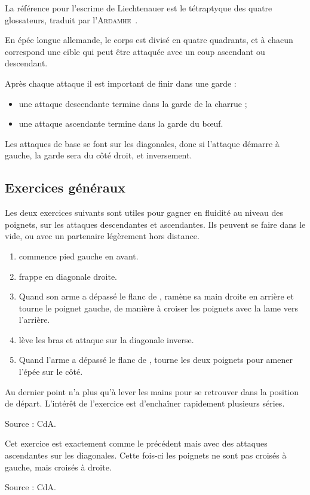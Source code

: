 La référence pour l'escrime de Liechtenauer est le tétraptyque des quatre glossateurs, traduit par l'\textsc{Ardamhe}~\cite{ardamhe:tetraptyque}.

En épée longue allemande, le corps est divisé en quatre quadrants, et à chacun correspond une cible qui peut être attaquée avec un coup ascendant ou descendant.

Après chaque attaque il est important de finir dans une garde :
\begin{itemize}
	\item une attaque descendante termine dans la garde de la charrue ;
	\item une attaque ascendante termine dans la garde du bœuf.
\end{itemize}
Les attaques de base se font sur les diagonales, donc si l'attaque démarre à gauche, la garde sera du côté droit, et inversement.

\subsection{Exercices généraux}

Les deux exercices suivants sont utiles pour gagner en fluidité au niveau des poignets, sur les attaques descendantes et ascendantes. Ils peuvent se faire dans le vide, ou avec un partenaire légèrement hors distance.

\begin{exercice}
\begin{enumerate}
	\item \A commence pied gauche en avant.
	\item \A frappe en diagonale droite.
	\item Quand son arme a dépassé le flanc de \D, \A ramène sa main droite en arrière et tourne le poignet gauche, de manière à croiser les poignets avec la lame vers l'arrière.
	\item \A lève les bras et attaque sur la diagonale inverse.
	\item Quand l'arme a dépassé le flanc de \D, \A tourne les deux poignets pour amener l'épée sur le côté.
\end{enumerate}

Au dernier point \A n'a plus qu'à lever les mains pour se retrouver dans la position de départ. L'intérêt de l'exercice est d'enchaîner rapidement plusieurs séries.

Source : CdA.
\end{exercice}

\begin{exercice}
Cet exercice est exactement comme le précédent mais avec des attaques ascendantes sur les diagonales. Cette fois-ci les poignets ne sont pas croisés à gauche, mais croisés à droite.

Source : CdA.
\end{exercice}

